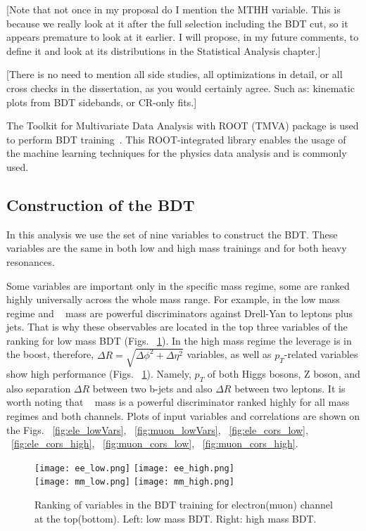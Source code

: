            [Note that not once in my proposal do I mention the MTHH variable. This is because we really  look
          at it after  the full selection including the BDT cut, so it appears premature to look at it earlier.
          I will propose, in my future comments, to define it and look at its distributions in the Statistical Analysis chapter.]

           [There is no need to mention all side studies, all optimizations in detail, or all cross checks in 
          the dissertation, as you would certainly agree. Such as: kinematic plots from BDT sidebands,
          or CR-only fits.]
          
          
The Toolkit for Multivariate Data Analysis with ROOT (TMVA) package is used to perform BDT training~\cite{Hocker:2007ht}. This ROOT-integrated library enables the usage of the machine learning techniques for the physics data analysis and is commonly used. 

\subsection{Construction of the BDT}
In this analysis we use the set of nine variables to construct the BDT. These variables are the same in both low and high mass trainings and for both heavy resonances.

Some variables are important only in the specific mass regime, some are ranked highly universally across the whole mass range. For example, in the low mass regime \ETmiss and \HBB~ mass are powerful discriminators against Drell-Yan to leptons plus jets. That is why these
observables are located in the top three variables of the ranking for low mass BDT (Figs. ~\ref{fig:ranking}). In the high mass regime the leverage is in the boost, therefore, $\Delta R = \sqrt{\Delta \phi^2 + \Delta \eta^2}$ variables, as well as $p_{T}$-related variables show high performance (Figs. ~\ref{fig:ranking}). Namely, $p_{T}$ of both Higgs bosons, Z boson, and also
separation $\Delta R $  between two b-jets and also $\Delta R$ between  two leptons. It is worth noting that \HBB~ mass is a powerful discriminator ranked highly for all mass regimes and both channels. Plots of input variables and correlations are shown on the Figs. ~\ref{fig:ele_lowVars}, ~\ref{fig:muon_lowVars}, ~\ref{fig:ele_cors_low}, ~\ref{fig:ele_cors_high}, ~\ref{fig:muon_cors_low}, ~\ref{fig:muon_cors_high}.

\begin{figure}[tbp]
  \begin{center}
   \texttt{[image: ee\_low.png]}
   \texttt{[image: ee\_high.png]}\\
   \texttt{[image: mm\_low.png]}
   \texttt{[image: mm\_high.png]}
    \caption{ Ranking of variables in the BDT training for electron(muon) channel at the top(bottom). Left: low mass BDT. Right: high mass BDT.}
    \label{fig:ranking}
  \end{center}
\end{figure}


